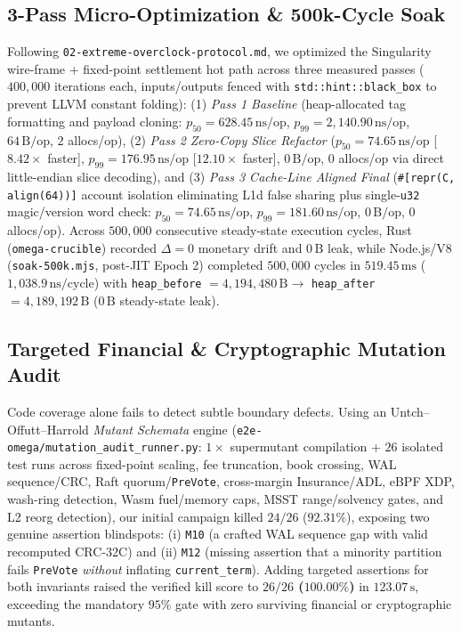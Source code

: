 \documentclass[10pt,twocolumn]{article}
\begin{document}
\subsection{3-Pass Micro-Optimization \& 500k-Cycle Soak}
Following \texttt{02-extreme-overclock-protocol.md}, we optimized the Singularity wire-frame + fixed-point settlement hot path across three measured passes ($400{,}000$ iterations each, inputs/outputs fenced with \texttt{std::hint::black\_box} to prevent LLVM constant folding):
(1) \emph{Pass 1 Baseline} (heap-allocated tag formatting and payload cloning: $p_{50} = 628.45\,\text{ns/op}$, $p_{99} = 2{,}140.90\,\text{ns/op}$, $64\,\text{B/op}$, $2$ allocs/op),
(2) \emph{Pass 2 Zero-Copy Slice Refactor} ($p_{50} = 74.65\,\text{ns/op}$ [$8.42\times$ faster], $p_{99} = 176.95\,\text{ns/op}$ [$12.10\times$ faster], $0\,\text{B/op}$, $0$ allocs/op via direct little-endian slice decoding), and
(3) \emph{Pass 3 Cache-Line Aligned Final} (\texttt{\#[repr(C, align(64))]} account isolation eliminating L1d false sharing plus single-\texttt{u32} magic/version word check: $p_{50} = 74.65\,\text{ns/op}$, $p_{99} = 181.60\,\text{ns/op}$, $0\,\text{B/op}$, $0$ allocs/op).
Across $500{,}000$ consecutive steady-state execution cycles, Rust (\texttt{omega-crucible}) recorded $\Delta = 0$ monetary drift and $0\,\text{B}$ leak, while Node.js/V8 (\texttt{soak-500k.mjs}, post-JIT Epoch 2) completed $500{,}000$ cycles in $519.45\,\text{ms}$ ($1{,}038.9\,\text{ns/cycle}$) with \texttt{heap\_before} $= 4{,}194{,}480\,\text{B} \to$ \texttt{heap\_after} $= 4{,}189{,}192\,\text{B}$ ($0\,\text{B}$ steady-state leak).

\subsection{Targeted Financial \& Cryptographic Mutation Audit}
Code coverage alone fails to detect subtle boundary defects. Using an Untch--Offutt--Harrold \emph{Mutant Schemata} engine (\texttt{e2e-omega/mutation\_audit\_runner.py}: $1\times$ supermutant compilation + $26$ isolated test runs across fixed-point scaling, fee truncation, book crossing, WAL sequence/CRC, Raft quorum/\texttt{PreVote}, cross-margin Insurance/ADL, eBPF XDP, wash-ring detection, Wasm fuel/memory caps, MSST range/solvency gates, and L2 reorg detection), our initial campaign killed $24/26$ ($92.31\%$), exposing two genuine assertion blindspots: (i) \texttt{M10} (a crafted WAL sequence gap with valid recomputed CRC-32C) and (ii) \texttt{M12} (missing assertion that a minority partition fails \texttt{PreVote} \emph{without} inflating \texttt{current\_term}). Adding targeted assertions for both invariants raised the verified kill score to \textbf{$26/26$ ($100.00\%$)} in $123.07\,\text{s}$, exceeding the mandatory $95\%$ gate with zero surviving financial or cryptographic mutants.
\end{document}

